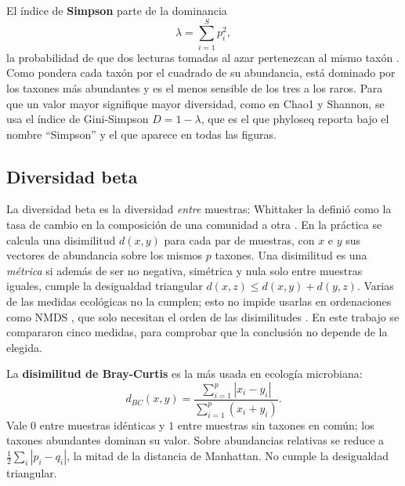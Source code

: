 El índice de \textbf{Simpson} parte de la dominancia
\begin{equation}
\lambda = \sum_{i=1}^{S} p_i^{2},
\label{eq:simpson}
\end{equation}
la probabilidad de que dos lecturas tomadas al azar pertenezcan al mismo taxón
\citep{simpson1949measurement}. Como pondera cada taxón por el cuadrado de su abundancia, está
dominado por los taxones más abundantes y es el menos sensible de los tres a los raros. Para que un
valor mayor signifique mayor diversidad, como en Chao1 y Shannon, se usa el índice de Gini-Simpson
$D = 1 - \lambda$, que es el que phyloseq reporta bajo el nombre ``Simpson'' y el que aparece en todas
las figuras.

\subsection{Diversidad beta}
\label{sec:diversidad_beta}

La diversidad beta es la diversidad \emph{entre} muestras: Whittaker la definió como la tasa de cambio
en la composición de una comunidad a otra \citep{whittaker1960vegetation}. En la práctica se calcula
una disimilitud $d(x, y)$ para cada par de muestras, con $x$ e $y$ sus vectores de abundancia sobre
los mismos $p$ taxones. Una disimilitud es una \emph{métrica} si además de ser no negativa, simétrica y
nula solo entre muestras iguales, cumple la desigualdad triangular $d(x,z) \leq d(x,y) + d(y,z)$.
Varias de las medidas ecológicas no la cumplen; esto no impide usarlas en ordenaciones como NMDS
\citep{kruskal1964multidimensional}, que solo necesitan el orden de las disimilitudes
\citep{legendre2012numerical}. En este trabajo se compararon cinco medidas, para comprobar que la
conclusión no depende de la elegida.

La \textbf{disimilitud de Bray-Curtis} \citep{bray&curtis1957ordination} es la más usada en ecología
microbiana:
\begin{equation}
d_{BC}(x, y) = \frac{\sum_{i=1}^{p} |x_i - y_i|}{\sum_{i=1}^{p} (x_i + y_i)}.
\label{eq:bray-curtis}
\end{equation}
Vale $0$ entre muestras idénticas y $1$ entre muestras sin taxones en común; los taxones abundantes
dominan su valor. Sobre abundancias relativas se reduce a $\frac{1}{2}\sum_i |p_i - q_i|$, la mitad de
la distancia de Manhattan. No cumple la desigualdad triangular.

